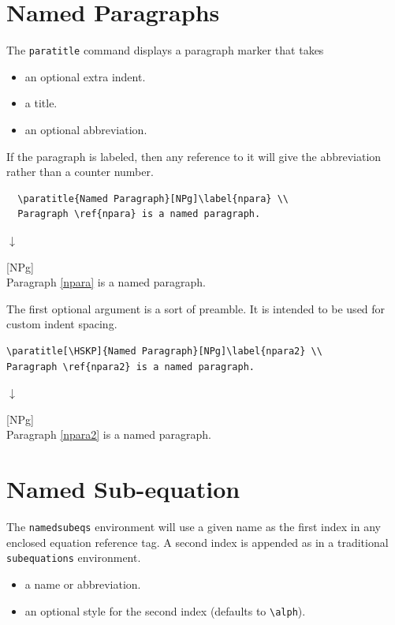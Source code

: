 \documentclass{article}
\begin{document}
\section{Named Paragraphs}
The \verb|paratitle| command displays a paragraph marker that takes
    \begin{itemize}
    \item[\texttt O.] an optional extra indent.
    \item[\texttt M.] a title.
    \item[\texttt O.] an optional abbreviation.
    \end{itemize}
If the paragraph is labeled, then any reference to it will give the abbreviation rather than a counter number.
\begin{tcolorbox}
  \begin{verbatim}
  \paratitle{Named Paragraph}[NPg]\label{npara} \\
  Paragraph \ref{npara} is a named paragraph.
  \end{verbatim}
\begin{center}$\downarrow$\end{center}
[NPg]\label{npara} \\
Paragraph \ref{npara} is a named paragraph.
\end{tcolorbox}


The first optional argument is a sort of preamble. It is intended to be used for custom indent spacing.
\begin{tcolorbox}
  \begin{verbatim}
\paratitle[\HSKP]{Named Paragraph}[NPg]\label{npara2} \\
Paragraph \ref{npara2} is a named paragraph.
  \end{verbatim}
\begin{center}$\downarrow$\end{center}
[NPg]\label{npara2} \\
Paragraph \ref{npara2} is a named paragraph.
\end{tcolorbox}



\section{Named Sub-equation}
The \verb|namedsubeqs| environment will use a given name as the first index in any enclosed equation reference tag. A second index is appended as in a traditional \verb|subequations| environment.
    \begin{itemize}
    \item[M.] a name or abbreviation.
    \item[O.] an optional style for the second index (defaults to \verb|\alph|).
    \end{itemize}
\end{document}
